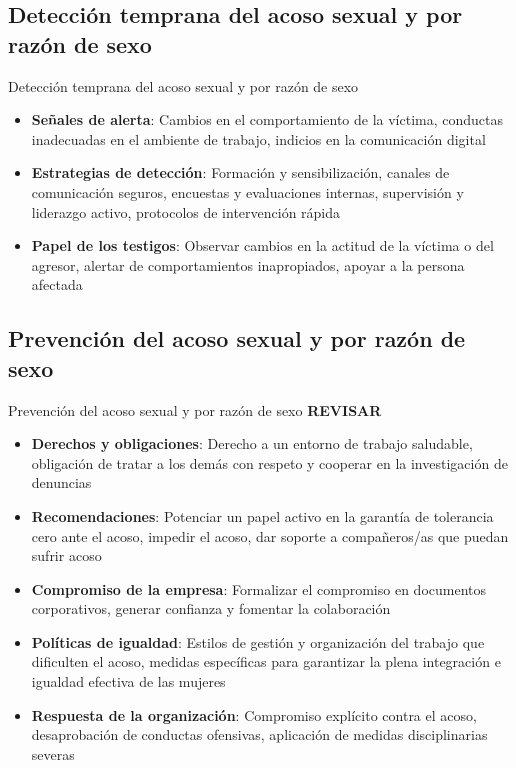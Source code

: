 \documentclass{beamer}
\begin{document}
    \subsection{Detección temprana del acoso sexual y por razón de sexo}
    \begin{frame}{Detección temprana del acoso sexual y por razón de sexo}
        \begin{itemize}
            \item \textbf{Señales de alerta}: Cambios en el comportamiento de la víctima, conductas inadecuadas en el ambiente de trabajo, indicios en la comunicación digital
            \item \textbf{Estrategias de detección}: Formación y sensibilización, canales de comunicación seguros, encuestas y evaluaciones internas, supervisión y liderazgo activo, protocolos de intervención rápida
            \item \textbf{Papel de los testigos}: Observar cambios en la actitud de la víctima o del agresor, alertar de comportamientos inapropiados, apoyar a la persona afectada
        \end{itemize}
    \end{frame}

    \subsection{Prevención del acoso sexual y por razón de sexo}
    \begin{frame}{Prevención del acoso sexual y por razón de sexo}
        \textbf{REVISAR}
        \begin{itemize}
            \item \textbf{Derechos y obligaciones}: Derecho a un entorno de trabajo saludable, obligación de tratar a los demás con respeto y cooperar en la investigación de denuncias
            \item \textbf{Recomendaciones}: Potenciar un papel activo en la garantía de tolerancia cero ante el acoso, impedir el acoso, dar soporte a compañeros/as que puedan sufrir acoso
            \item \textbf{Compromiso de la empresa}: Formalizar el compromiso en documentos corporativos, generar confianza y fomentar la colaboración
            \item \textbf{Políticas de igualdad}: Estilos de gestión y organización del trabajo que dificulten el acoso, medidas específicas para garantizar la plena integración e igualdad efectiva de las mujeres
            \item \textbf{Respuesta de la organización}: Compromiso explícito contra el acoso, desaprobación de conductas ofensivas, aplicación de medidas disciplinarias severas
        \end{itemize}
    \end{frame}
\end{document}
